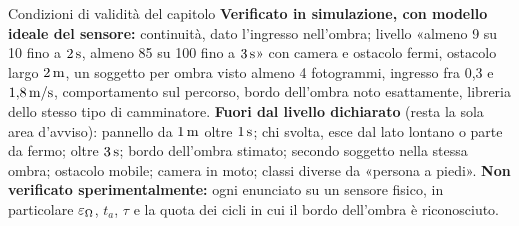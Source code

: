 \begin{riquadro}{Condizioni di validità del capitolo}
\textbf{Verificato in simulazione, con modello ideale del sensore:} continuità, dato l'ingresso nell'ombra; livello «almeno 9 su 10 fino a $2\,\mathrm{s}$, almeno 85 su 100 fino a $3\,\mathrm{s}$» con camera e ostacolo fermi, ostacolo largo $2\,\mathrm{m}$, un soggetto per ombra visto almeno 4 fotogrammi, ingresso fra 0,3 e $1{,}8\,\mathrm{m/s}$, comportamento sul percorso, bordo dell'ombra noto esattamente, libreria dello stesso tipo di camminatore.
\textbf{Fuori dal livello dichiarato} (resta la sola area d'avviso): pannello da $1\,\mathrm{m}$ oltre $1\,\mathrm{s}$; chi svolta, esce dal lato lontano o parte da fermo; oltre $3\,\mathrm{s}$; bordo dell'ombra stimato; secondo soggetto nella stessa ombra; ostacolo mobile; camera in moto; classi diverse da «persona a piedi».
\textbf{Non verificato sperimentalmente:} ogni enunciato su un sensore fisico, in particolare $\varepsilon_\Omega$, $t_a$, $\tau$ e la quota dei cicli in cui il bordo dell'ombra è riconosciuto.
\end{riquadro}

